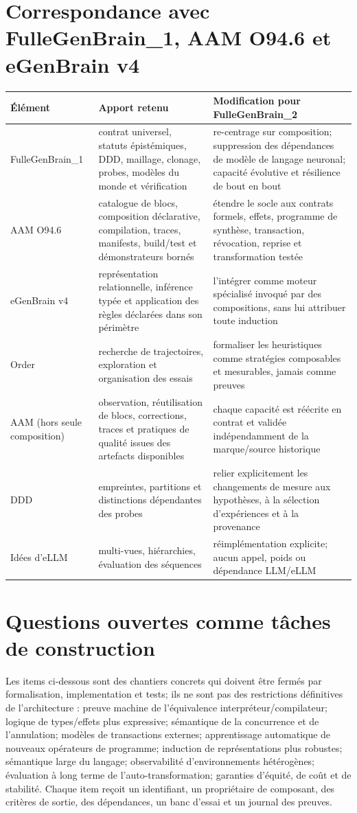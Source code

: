 \documentclass[11pt,a4paper]{article}
\begin{document}
\section{Correspondance avec FulleGenBrain\_1, AAM O94.6 et eGenBrain v4}
\begin{longtable}{p{}p{}p{}}
\toprule Élément & Apport retenu & Modification pour FulleGenBrain\_2 \\
\midrule
FulleGenBrain\_1 & contrat universel, statuts épistémiques, DDD, maillage, clonage, probes, modèles du monde et vérification & re-centrage sur composition; suppression des dépendances de modèle de langage neuronal; capacité évolutive et résilience de bout en bout \\
AAM O94.6 & catalogue de blocs, composition déclarative, compilation, traces, manifests, build/test et démonstrateurs bornés & étendre le socle aux contrats formels, effets, programme de synthèse, transaction, révocation, reprise et transformation testée \\
eGenBrain v4 & représentation relationnelle, inférence typée et application des règles déclarées dans son périmètre & l'intégrer comme moteur spécialisé invoqué par des compositions, sans lui attribuer toute induction \\
Order & recherche de trajectoires, exploration et organisation des essais & formaliser les heuristiques comme stratégies composables et mesurables, jamais comme preuves \\
AAM (hors seule composition) & observation, réutilisation de blocs, corrections, traces et pratiques de qualité issues des artefacts disponibles & chaque capacité est réécrite en contrat et validée indépendamment de la marque/source historique \\
DDD & empreintes, partitions et distinctions dépendantes des probes & relier explicitement les changements de mesure aux hypothèses, à la sélection d'expériences et à la provenance \\
Idées d’eLLM & multi-vues, hiérarchies, évaluation des séquences & réimplémentation explicite; aucun appel, poids ou dépendance LLM/eLLM \\
\bottomrule
\end{longtable}

\section{Questions ouvertes comme tâches de construction}
Les items ci-dessous sont des chantiers concrets qui doivent être fermés par formalisation, implementation et tests; ils ne sont pas des restrictions définitives de l'architecture : preuve machine de l'équivalence interpréteur/compilateur; logique de types/effets plus expressive; sémantique de la concurrence et de l'annulation; modèles de transactions externes; apprentissage automatique de nouveaux opérateurs de programme; induction de représentations plus robustes; sémantique large du langage; observabilité d'environnements hétérogènes; évaluation à long terme de l'auto-transformation; garanties d'équité, de coût et de stabilité. Chaque item reçoit un identifiant, un propriétaire de composant, des critères de sortie, des dépendances, un banc d'essai et un journal des preuves.
\end{document}
